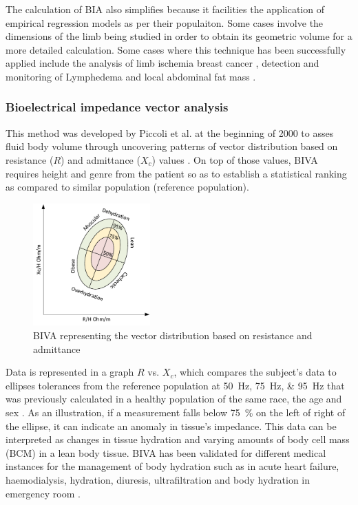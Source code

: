 The calculation of BIA also simplifies because it facilities the application of empirical regression models as per their populaiton\cite{kyle2004bioelectrical}. Some cases involve the dimensions of the limb being studied in order to obtain its geometric volume for a more detailed calculation.  Some cases where this technique has been successfully applied include the analysis of limb ischemia \cite{songer2001tissue, kun1994tissue} breast cancer \cite{zou2003review}, detection and monitoring of Lymphedema \cite{vicini2012bioelectrical} and local abdominal fat mass \cite{scharfetter2001assessing}. 

\subsubsection{Bioelectrical impedance vector analysis}
This method was developed by Piccoli et al. \cite{piccoli2000relationship, piccoli2002impedance} at the beginning of 2000 to asses fluid body volume through uncovering patterns of vector distribution based on resistance ($R$) and admittance ($X_{c}$) values \cite{thomas2003comparison}. On top of those values, BIVA requires height and genre from the patient so as to establish a statistical ranking as compared to similar population (reference population). 

\begin{figure}[!htpb]
	\centering
	\includegraphics[width=0.4\textwidth,keepaspectratio]{figure13}    
	\caption[BIVA representation]{BIVA representing the vector distribution based on resistance and admittance}
	\label{fig:BIVA plot}
\end{figure}

Data is represented in a graph $R$ vs. $X_{c}$, which compares the subject's data to ellipses tolerances from the reference population at \SIlist{50;75;95}{\hertz} that was previously calculated in a healthy population of the same race, the age and sex \cite{kyle2004bioelectrical,piccoli2000relationship, piccoli2002impedance}. As an illustration, if a measurement falls below \SI{75}{\percent} on the left of right of the ellipse, it can indicate an anomaly in tissue's impedance. This data can be interpreted as changes in tissue hydration and varying amounts of body cell mass (BCM) in a lean body tissue. BIVA has been validated for different medical instances for the management of body hydration such as in acute heart failure, haemodialysis, hydration, diuresis, ultrafiltration and body hydration in emergency room \cite{disomma2011consensus}. 

